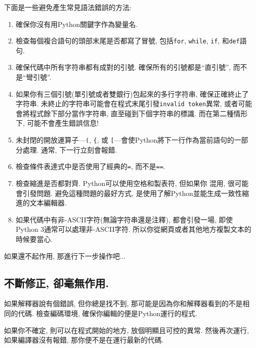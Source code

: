 \documentclass[10pt]{book}
\begin{document}
下面是一些避免產生常見語法錯誤的方法:

\begin{enumerate}

\item 確保你沒有用Python關鍵字作為變量名. 

\item 檢查每個複合語句的頭部末尾是否都寫了冒號, 包括{\tt for}, {\tt while},
{\tt if}, 和{\tt def}語句. 

\item 確保代碼中所有字符串都有成對的引號. 確保所有的引號都是``直引號'', 而不是``彎引號''. 

\item 如果你有三個引號(單引號或者雙銀行)包起來的多行字符串, 確保正確終止了字符串. 
未終止的字符串可能會在程式末尾引發{\tt invalid token}異常, 
或者可能會將程式餘下部分當作字符串, 直至碰到下個字符串的標識. 
而在第二種情形下, 可能不會產生錯誤信息!

\item 未封閉的開放運算子---\verb+(+, \verb+{+, 或
\verb+[+---會使Python將下一行作為當前語句的一部分處理. 
通常, 下一行立刻會報錯. 

\item 檢查條件表達式中是否使用了經典的{\tt =}, 而不是{\tt ==}.

\item 檢查縮進是否都對齊. Python可以使用空格和製表符, 但如果你
混用, 很可能會引發問題. 
避免這種問題的最好方式, 是使用了解Python並能生成一致性縮進的文本編輯器. 

\item 如果代碼中有非-ASCII字符(無論字符串還是注釋), 都會引發一場, 
即使Python 3通常可以處理非-ASCII字符. 
所以你從網頁或者其他地方複製文本的時候要當心. 

\end{enumerate}

如果還不起作用, 那進行下一步操作吧...


\subsection{不斷修正, 卻毫無作用.}

如果解釋器說有個錯誤, 但你總是找不到, 
那可能是因為你和解釋器看到的不是相同的代碼. 
檢查編碼環境, 確保你編輯的便是Python運行的程式. 

如果你不確定, 則可以在程式開始的地方, 放個明顯且可控的異常. 
然後再次運行, 如果編譯器沒有報錯, 那你便不是在運行最新的代碼. 
\end{document}
